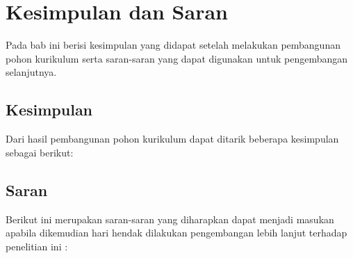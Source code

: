 
\chapter{Kesimpulan dan Saran}
\label{chap: Kesimpulan dan Saran}

Pada bab ini berisi kesimpulan yang didapat setelah melakukan pembangunan pohon kurikulum serta saran-saran yang dapat digunakan untuk pengembangan selanjutnya.

\section{Kesimpulan}
\label{sec: Kesimpulan}

Dari hasil pembangunan pohon kurikulum dapat ditarik beberapa kesimpulan sebagai berikut:
\begin{enumerate}

\end{enumerate}

\section{Saran}
\label{sec: Saran}

Berikut ini merupakan saran-saran yang diharapkan dapat menjadi masukan apabila dikemudian
hari hendak dilakukan pengembangan lebih lanjut terhadap penelitian ini :